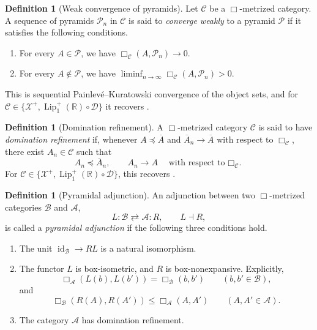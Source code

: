 \documentclass{amsart}
\theoremstyle{plain}
\theoremstyle{definition}
\newtheorem{definition}[theorem]{Definition}
\theoremstyle{remark}
\newcommand{\R}{\mathbb{R}}
\newcommand{\D}{\mathcal{D}}
\newcommand{\Xp}{\mathcal{X}^{+}}
\newcommand{\Lup}{\operatorname{Lip}^{+}_{1}(\R)}
\begin{document}
\begin{definition}[Weak convergence of pyramids]
\label{def:pyramid-weak-convergence}
Let $\mathcal C$ be a $\Box$-metrized category. A sequence of pyramids $\mathcal P_n$ in $\mathcal C$ is said to \emph{converge weakly} to a pyramid $\mathcal P$ if it satisfies the following conditions.
\begin{enumerate}[label=\textup{(\roman*)}]
\item For every $A\in\mathcal P$, we have $\Box_{\mathcal C}(A,\mathcal P_n)\to0$.
\item For every $A\notin\mathcal P$, we have $\liminf_{n\to\infty}\Box_{\mathcal C}(A,\mathcal P_n)>0$.
\end{enumerate}
This is sequential Painlev\'e--Kuratowski convergence of the object sets, and for $\mathcal C\in\{\Xp,\Lup\circ\D\}$ it recovers .
\end{definition}

\begin{definition}[Domination refinement]
\label{def:domination-refinement}
A $\Box$-metrized category $\mathcal C$ is said to have \emph{domination refinement} if, whenever $A\preceq\overline A$ and $\overline A_n\to\overline A$ with respect to $\Box_{\mathcal C}$, there exist $A_n\in\mathcal C$ such that
\[A_n\preceq\overline A_n,\qquad A_n\longrightarrow A\quad\text{with respect to $\Box_{\mathcal C}$.}\]
For $\mathcal C\in\{\Xp,\Lup\circ\D\}$, this recovers .
\end{definition}

\begin{definition}[Pyramidal adjunction]
\label{def:pyramidal-adjunction}
An adjunction between two $\Box$-metrized categories $\mathcal B$ and $\mathcal A$,
\[L\colon\mathcal B\rightleftarrows\mathcal A\colon R,\qquad L\dashv R,\]
is called a \emph{pyramidal adjunction} if the following three conditions hold.
\begin{enumerate}[label=\textup{(\roman*)}]
\item The unit $\operatorname{id}_{\mathcal B}\to R L$ is a natural isomorphism.
\item The functor $L$ is box-isometric, and $R$ is box-nonexpansive. Explicitly,
\[
\Box_{\mathcal A}(L(b),L(b'))=\Box_{\mathcal B}(b,b')
\qquad(b,b'\in\mathcal B),
\]
and
\[
\Box_{\mathcal B}(R(A),R(A'))\leq\Box_{\mathcal A}(A,A')
\qquad(A,A'\in\mathcal A).
\]
\item The category $\mathcal A$ has domination refinement.
\end{enumerate}
\end{definition}
\end{document}
